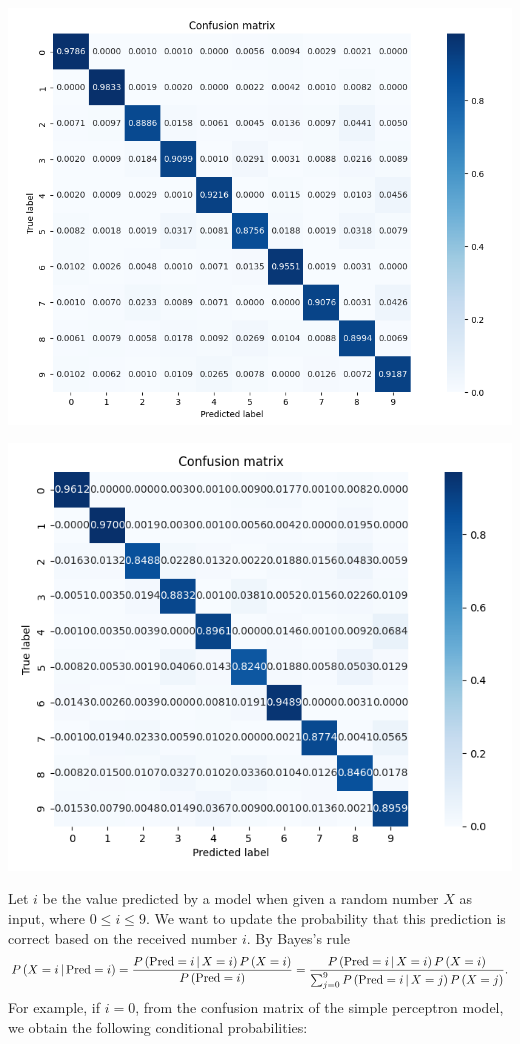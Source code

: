 \documentclass{article}
\begin{document}
\hspace{-0.3in}
\begin{minipage}{0.5\linewidth}
\includegraphics[width = \linewidth]{Confusion_matrix3.png}
\end{minipage}
\begin{minipage}{0.5\linewidth}
\includegraphics[width = \linewidth]{Confusion_matrix4.png}
\end{minipage}
\medskip

Let $i$ be the value predicted by a model when given a random number $X$ as input, where $0\leq i\leq 9$. We want to update the probability that this prediction is correct based on the received number $i$. By Bayes's rule
$$
P\left(X=i\,|\, {\rm Pred}=i\right)=\frac{P\left({\rm Pred}=i\,|\, X=i\right)P\left(X=i\right)}{P\left({\rm Pred}=i\right)}
=\frac{P\left({\rm Pred}=i\,|\, X=i\right)P\left(X=i\right)}{\sum_{j=0}^9P\left({\rm Pred}=i\,|\,X=j\right)P\left(X=j\right)}.
$$
For example, if $i=0$, from the confusion matrix of the simple perceptron model, we obtain the following conditional probabilities:
\medskip
\end{document}
